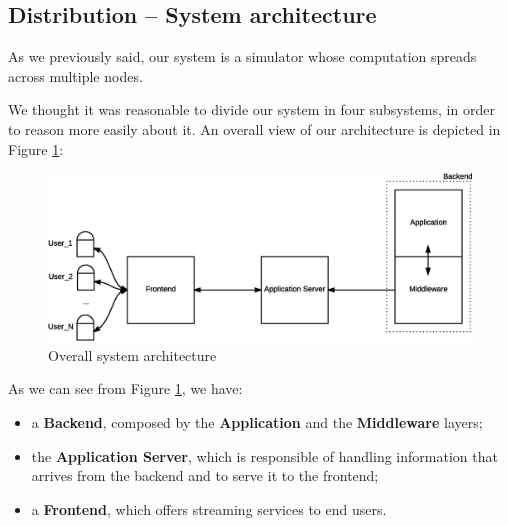 \subsection{Distribution -- System architecture}
As we previously said, our system is a simulator whose computation spreads
across multiple nodes.

We thought it was reasonable to divide our system in four subsystems, in order
to reason more easily about it. An overall view of our architecture is depicted
in Figure \ref{fig:sd-sys-arch-overall}:

\begin{figure}[H]
  \centering
  \includegraphics[scale=0.5,keepaspectratio]
    {images/solution/overall-arch.eps}
  \caption{Overall system architecture}
  \label{fig:sd-sys-arch-overall}
\end{figure}

As we can see from Figure \ref{fig:sd-sys-arch-overall}, we have:

\begin{itemize}
  \item a \textbf{Backend}, composed by the \textbf{Application} and the
    \textbf{Middleware} layers;
  \item the \textbf{Application Server}, which is responsible of handling
    information that arrives from the backend and to serve it to the frontend;
  \item a \textbf{Frontend}, which offers streaming services to end users.
\end{itemize}
